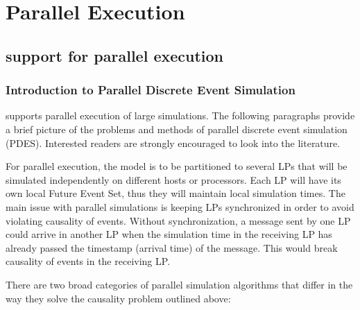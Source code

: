\chapter{Parallel Execution}
\label{cha:parallel-execution}

\section{{\opp} support for parallel execution}

\subsection{Introduction to Parallel Discrete Event Simulation}

{\opp} supports parallel execution of large
simulations. The following paragraphs provide a brief picture
of the problems and methods of parallel
discrete event simulation (PDES). Interested readers are
strongly encouraged to look into the literature.

For parallel execution, the model is to be partitioned to several
LPs that will be simulated independently on different hosts or
processors. Each LP will have its own local Future Event Set,
thus they will maintain local simulation times. The main issue with
parallel simulations is keeping LPs synchronized in order to
avoid violating causality of events. Without synchronization, a
message sent by one LP could arrive in another LP when the
simulation time in the receiving LP has already passed the
timestamp (arrival time) of the message. This would break
causality of events in the receiving LP.

There are two broad categories of parallel simulation algorithms
that differ in the way they solve the causality problem outlined
above:


